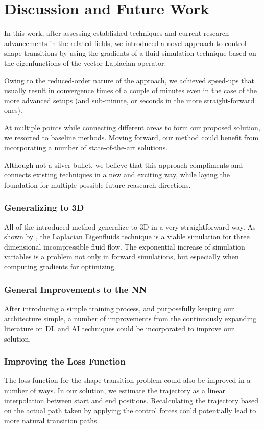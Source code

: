 \chapter{Discussion and Future Work}\label{chapter:discussion}
In this work, after assessing established techniques and current research
advancements in the related fields, we introduced a novel approach to control
shape transitions by using the gradients of a fluid simulation technique based
on the eigenfunctions of the vector Laplacian operator. 

Owing to the reduced-order nature of the approach, we achieved speed-ups that
usually result in convergence times of a couple of minutes even in the case of
the more advanced setups (and sub-minute, or seconds in the more
straight-forward ones).

At multiple points while connecting different areas to form our proposed
solution, we resorted to baseline methods. Moving forward, our method could
benefit from incorporating a number of state-of-the-art solutions.

Although not a silver bullet, we believe that this approach compliments and
connects existing techniques in a new and exciting way, while laying the
foundation for multiple possible future reasearch directions. 

\subsection*{Generalizing to 3D}
All of the introduced method generalize to 3D in a very straightforward way. As
shown by \cite{scalable-eigenfluids}, the Laplacian Eigenfluids technique is
a viable simulation for three dimensional incompressible fluid flow. The
exponential increase of simulation variables is a problem not only in forward
simulations, but especially when computing gradients for optimizing. 

\subsection*{General Improvements to the NN}
After introducing a simple training process, and purposefully keeping our
architecture simple, a number of improvements from the continuously expanding
literature on \ac{DL} and \ac{AI} techniques could be incorporated to improve
our solution.

\subsection*{Improving the Loss Function}
The loss function for the shape transition problem could also be improved in
a number of ways. In our solution, we estimate the trajectory as a linear
interpolation between start and end positions. Recalculating the trajectory
based on the actual path taken by applying the control forces could potentially
lead to more natural transition paths.

